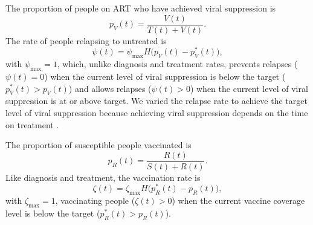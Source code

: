 \documentclass{article}
\begin{document}
The proportion of people on ART who have achieved viral suppression is
\begin{equation}
  p_V(t) = \frac{V(t)}{T(t) + V(t)}.
\end{equation}
The rate of people relapsing to untreated is
\begin{equation}
  \label{relapse_rate}
  \psi(t) = \psi_{\max} H\big(p_V(t) - p_V^*(t)\big),
\end{equation}
with $\psi_{\max} = 1$, which, unlike diagnosis and treatment rates,
prevents relapses ($\psi(t) = 0$) when the current level of viral
suppression is below the target ($p_V^*(t) > p_V(t)$) and allows
relapses ($\psi(t) > 0$) when the current level of viral suppression
is at or above target.  We varied the relapse rate to achieve the
target level of viral suppression because achieving viral suppression
depends on the time on treatment \cite{Currie2009-yz}.

The proportion of susceptible people vaccinated is
\begin{equation}
  p_R(t) = \frac{R(t)}{S(t) + R(t)}.
\end{equation}
Like diagnosis and treatment, the vaccination rate is
\begin{equation}
  \label{vaccination_rate}
  \zeta(t) = \zeta_{\max} H\big(p_R^*(t) - p_R(t)\big),
\end{equation}
with $\zeta_{\max} = 1$, vaccinating people ($\zeta(t) > 0$) when the
current vaccine coverage level is below the target
($p_R^*(t) > p_R(t)$).
\end{document}

